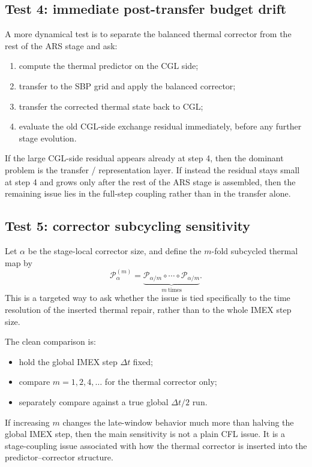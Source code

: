 \documentclass[11pt]{article}
\begin{document}
\subsection{Test 4: immediate post-transfer budget drift}

A more dynamical test is to separate the balanced thermal corrector from the
rest of the ARS stage and ask:

\begin{enumerate}[label=\arabic*.]
\item compute the thermal predictor on the CGL side;
\item transfer to the SBP grid and apply the balanced corrector;
\item transfer the corrected thermal state back to CGL;
\item evaluate the old CGL-side exchange residual immediately, before any
further stage evolution.
\end{enumerate}

If the large CGL-side residual appears already at step 4, then the dominant
problem is the transfer / representation layer. If instead the residual stays
small at step 4 and grows only after the rest of the ARS stage is assembled,
then the remaining issue lies in the full-step coupling rather than in the
transfer alone.

\subsection{Test 5: corrector subcycling sensitivity}

Let $\alpha$ be the stage-local corrector size, and define the $m$-fold
subcycled thermal map by
\[
\mathcal P_\alpha^{(m)}
=
\underbrace{
\mathcal P_{\alpha/m}
\circ \cdots \circ
\mathcal P_{\alpha/m}
}_{m\ \text{times}}.
\]
This is a targeted way to ask whether the issue is tied specifically to the
time resolution of the inserted thermal repair, rather than to the whole IMEX
step size.

The clean comparison is:
\begin{itemize}
\item hold the global IMEX step $\Delta t$ fixed;
\item compare $m=1,2,4,\dots$ for the thermal corrector only;
\item separately compare against a true global $\Delta t/2$ run.
\end{itemize}

If increasing $m$ changes the late-window behavior much more than halving the
global IMEX step, then the main sensitivity is not a plain CFL issue. It is a
stage-coupling issue associated with how the thermal corrector is inserted into
the predictor--corrector structure.
\end{document}
